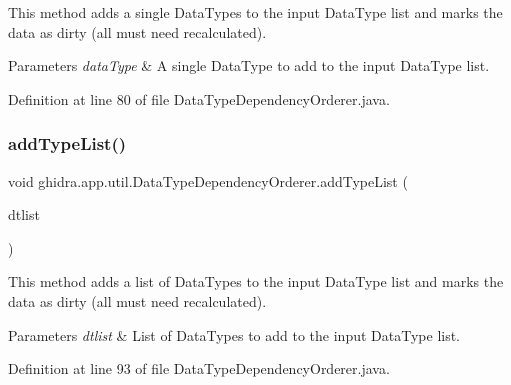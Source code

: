This method adds a single Data\+Types to the input Data\+Type list and marks the data as dirty (all must need recalculated). 
\begin{DoxyParams}{Parameters}
{\em data\+Type} & A single Data\+Type to add to the input Data\+Type list. \\
\hline
\end{DoxyParams}


Definition at line 80 of file Data\+Type\+Dependency\+Orderer.\+java.

\mbox{\label{classghidra_1_1app_1_1util_1_1_data_type_dependency_orderer_aa655bed27103a787f66e486017a661c8}} 
\subsubsection{\texorpdfstring{addTypeList()}{addTypeList()}}
{\footnotesize\ttfamily void ghidra.\+app.\+util.\+Data\+Type\+Dependency\+Orderer.\+add\+Type\+List (\begin{DoxyParamCaption}\item[{Array\+List$<$ Data\+Type $>$}]{dtlist }\end{DoxyParamCaption})\hspace{0.3cm}{\ttfamily [inline]}}

This method adds a list of Data\+Types to the input Data\+Type list and marks the data as dirty (all must need recalculated). 
\begin{DoxyParams}{Parameters}
{\em dtlist} & List of Data\+Types to add to the input Data\+Type list. \\
\hline
\end{DoxyParams}


Definition at line 93 of file Data\+Type\+Dependency\+Orderer.\+java.

\mbox{\label{classghidra_1_1app_1_1util_1_1_data_type_dependency_orderer_a9059ee85fb81cb0aa66d60eee9759c1a}} 
